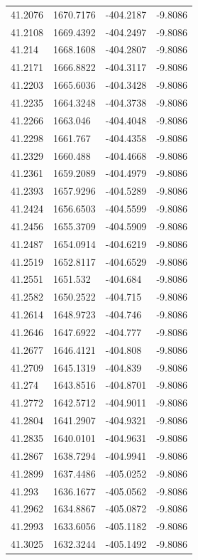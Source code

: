\begin{table}[H]
\begin{tabular}{llll}
41.2076 & 1670.7176 & -404.2187 & -9.8086 \\
41.2108 & 1669.4392 & -404.2497 & -9.8086 \\
41.214 & 1668.1608 & -404.2807 & -9.8086 \\
41.2171 & 1666.8822 & -404.3117 & -9.8086 \\
41.2203 & 1665.6036 & -404.3428 & -9.8086 \\
41.2235 & 1664.3248 & -404.3738 & -9.8086 \\
41.2266 & 1663.046 & -404.4048 & -9.8086 \\
41.2298 & 1661.767 & -404.4358 & -9.8086 \\
41.2329 & 1660.488 & -404.4668 & -9.8086 \\
41.2361 & 1659.2089 & -404.4979 & -9.8086 \\
41.2393 & 1657.9296 & -404.5289 & -9.8086 \\
41.2424 & 1656.6503 & -404.5599 & -9.8086 \\
41.2456 & 1655.3709 & -404.5909 & -9.8086 \\
41.2487 & 1654.0914 & -404.6219 & -9.8086 \\
41.2519 & 1652.8117 & -404.6529 & -9.8086 \\
41.2551 & 1651.532 & -404.684 & -9.8086 \\
41.2582 & 1650.2522 & -404.715 & -9.8086 \\
41.2614 & 1648.9723 & -404.746 & -9.8086 \\
41.2646 & 1647.6922 & -404.777 & -9.8086 \\
41.2677 & 1646.4121 & -404.808 & -9.8086 \\
41.2709 & 1645.1319 & -404.839 & -9.8086 \\
41.274 & 1643.8516 & -404.8701 & -9.8086 \\
41.2772 & 1642.5712 & -404.9011 & -9.8086 \\
41.2804 & 1641.2907 & -404.9321 & -9.8086 \\
41.2835 & 1640.0101 & -404.9631 & -9.8086 \\
41.2867 & 1638.7294 & -404.9941 & -9.8086 \\
41.2899 & 1637.4486 & -405.0252 & -9.8086 \\
41.293 & 1636.1677 & -405.0562 & -9.8086 \\
41.2962 & 1634.8867 & -405.0872 & -9.8086 \\
41.2993 & 1633.6056 & -405.1182 & -9.8086 \\
41.3025 & 1632.3244 & -405.1492 & -9.8086 \\

\end{tabular}
\end{table}
